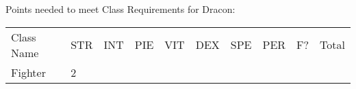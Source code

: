 \documentclass[12pt]{article}
\begin{document}
Points needed to meet Class Requirements for Dracon:

\begin{longtable}[]{@{}llllllllll@{}}
\toprule
\begin{minipage}[t]{0.13\columnwidth}\raggedright\strut
Class Name
\strut\end{minipage} &
\begin{minipage}[t]{0.06\columnwidth}\raggedright\strut
STR
\strut\end{minipage} &
\begin{minipage}[t]{0.06\columnwidth}\raggedright\strut
INT
\strut\end{minipage} &
\begin{minipage}[t]{0.06\columnwidth}\raggedright\strut
PIE
\strut\end{minipage} &
\begin{minipage}[t]{0.06\columnwidth}\raggedright\strut
VIT
\strut\end{minipage} &
\begin{minipage}[t]{0.06\columnwidth}\raggedright\strut
DEX
\strut\end{minipage} &
\begin{minipage}[t]{0.06\columnwidth}\raggedright\strut
SPE
\strut\end{minipage} &
\begin{minipage}[t]{0.06\columnwidth}\raggedright\strut
PER
\strut\end{minipage} &
\begin{minipage}[t]{0.07\columnwidth}\raggedright\strut
F?
\strut\end{minipage} &
\begin{minipage}[t]{0.08\columnwidth}\raggedright\strut
Total
\strut\end{minipage}\tabularnewline
\begin{minipage}[t]{0.13\columnwidth}\raggedright\strut
Fighter
\strut\end{minipage} &
\begin{minipage}[t]{0.06\columnwidth}\raggedright\strut
2
\strut\end{minipage} &
\begin{minipage}[t]{0.06\columnwidth}\raggedright\strut
\strut\end{minipage} &
\begin{minipage}[t]{0.06\columnwidth}\raggedright\strut
\strut\end{minipage} &
\begin{minipage}[t]{0.06\columnwidth}\raggedright\strut
\strut\end{minipage} &

\end{longtable}
\end{document}
